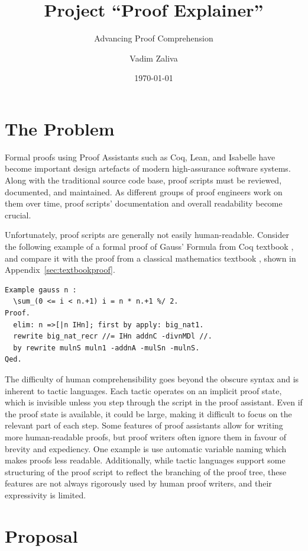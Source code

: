 \documentclass[10pt,nonacm,natbib=false]{acmart}
\title{Project ``Proof Explainer''}
\subtitle{Advancing Proof Comprehension}
\date{\today} %
\author{Vadim Zaliva}
\begin{document}
\maketitle

\section*{The Problem}

Formal proofs using Proof Assistants such as Coq, Lean, and Isabelle
have become important design artefacts of modern high-assurance
software systems. Along with the traditional source code base, proof
scripts must be reviewed, documented, and maintained. As different
groups of proof engineers work on them over time, proof scripts'
documentation and overall readability become crucial.

Unfortunately, proof scripts are generally not easily
human-readable. Consider the following example of a formal proof of
Gauss' Formula from Coq textbook \cite{mahboubi2021mathematical}, and
compare it with the proof from a classical mathematics textbook
\cite{roberts2014introduction}, shown in Appendix~\ref{sec:textbookproof}.

\begin{lstlisting}
Example gauss n :
  \sum_(0 <= i < n.+1) i = n * n.+1 %/ 2.
Proof.
  elim: n =>[|n IHn]; first by apply: big_nat1.
  rewrite big_nat_recr //= IHn addnC -divnMDl //.
  by rewrite mulnS muln1 -addnA -mulSn -mulnS.
Qed.
\end{lstlisting}

The difficulty of human comprehensibility goes beyond the obscure
syntax and is inherent to tactic languages. Each tactic operates on an
implicit proof state, which is invisible unless you step through the
script in the proof assistant. Even if the proof state is available,
it could be large, making it difficult to focus on the relevant part
of each step. Some features of proof assistants allow for writing more
human-readable proofs, but proof writers often ignore them in favour
of brevity and expediency. One example is use automatic variable
naming which makes proofs less readable. Additionally, while tactic
languages support some structuring of the proof script to reflect the
branching of the proof tree, these features are not always rigorously
used by human proof writers, and their expressivity is limited.

\section*{Proposal}
\end{document}
